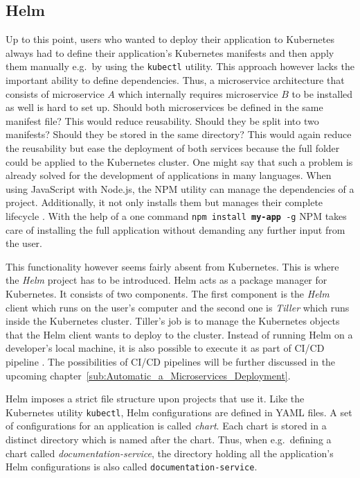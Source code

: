 
\subsection{Helm}%
\label{sub:Helm}
Up to this point, users who wanted to deploy their application to Kubernetes
always had to define their application's Kubernetes manifests and then apply them
manually e.g.\ by using the \texttt{kubectl} utility. This approach however
lacks the important ability to define dependencies. Thus, a microservice
architecture that consists of microservice $A$ which internally requires
microservice $B$ to be installed as well is hard to set up. Should both
microservices be defined in the same manifest file? This would reduce
reusability. Should they be split into two manifests? Should they be stored in
the same directory? This would again reduce the reusability but ease the
deployment of both services because the full folder could be applied to the
Kubernetes cluster. One might say that such a problem is already solved for the
development of applications in many languages. When using JavaScript with
Node.js, the \ac{NPM} utility can manage the dependencies of a project.
Additionally, it not only installs them but manages their complete lifecycle
\autocite{npm}. With the help of a one command \texttt{npm install
\textbf{my-app} -g} \ac{NPM} takes care of installing the full application
without demanding any further input from the user.

This functionality however seems fairly absent from Kubernetes. This is where
the \textit{Helm} project has to be introduced. Helm acts as a package manager
for Kubernetes. It consists of two components. The first component is the
\textit{Helm} client which runs on the user's computer and the second one is
\textit{Tiller} which runs inside the Kubernetes cluster. Tiller's job is to
manage the Kubernetes objects that the Helm client wants to deploy to the
cluster. Instead of running Helm on a developer's local machine, it is also
possible to execute it as part of \ac{CI}/\ac{CD} pipeline
\autocite{HelmDocumentationQuickstart}.  The possibilities of \ac{CI}/\ac{CD}
pipelines will be further discussed in the upcoming
chapter~\ref{sub:Automatic_a_Microservices_Deployment}.

Helm imposes a strict file structure upon projects that use it. Like the
Kubernetes utility \texttt{kubectl}, Helm configurations are defined in YAML
files. A set of configurations for an application is called \textit{chart}.
Each chart is stored in a distinct directory which is named after the chart.
Thus, when e.g.\ defining a chart called \textit{documentation-service}, the
directory holding all the application's Helm configurations is also called
\texttt{documentation-service}. 

